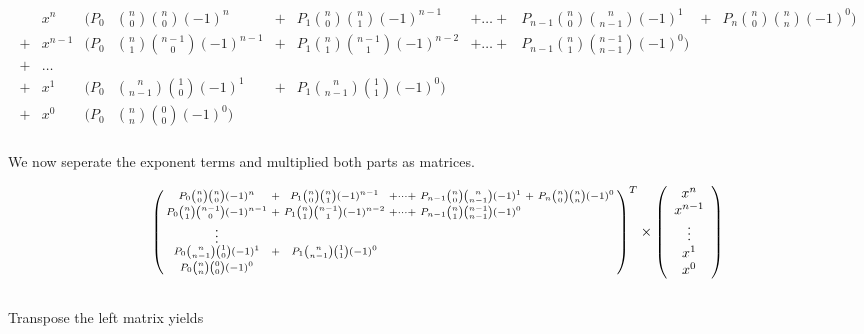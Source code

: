 \begin{gather}
    \begin{align*}
          & x^{n}   & (P_0 & {n \choose 0}{n \choose 0}(-1)^{n}     & + & P_1 {n \choose 0}{n \choose 1}(-1)^{n-1}   & + \dots + & P_{n-1} {n \choose 0}{n \choose n-1}(-1)^{1}    & + & P_{n} {n \choose 0}{n \choose n}(-1)^{0}) \\
        + & x^{n-1} & (P_0 & {n \choose 1}{n-1 \choose 0}(-1)^{n-1} & + & P_1 {n \choose 1}{n-1 \choose 1}(-1)^{n-2} & + \dots + & P_{n-1} {n \choose 1}{n-1 \choose n-1}(-1)^{0})                                                 \\
        + & \dots                                                                                                                                                                                                                  \\
        + & x^{1}   & (P_0 & {n \choose n-1}{1 \choose 0}(-1)^{1}   & + & P_1 {n \choose n-1}{1 \choose 1}(-1)^{0})                                                                                                                \\
        + & x^{0}   & (P_0 & {n \choose n}{0 \choose 0}(-1)^{0})
    \end{align*}
\end{gather}
\\ We now seperate the exponent terms and multiplied both parts as matrices.

\begin{equation*}
    \begin{psmallmatrix}
        P_0 {n \choose 0}{n \choose 0}(-1)^{n} &+&  P_1 {n \choose 0}{n \choose 1}(-1)^{n-1}  &+ \dots + &P_{n-1} {n \choose 0}{n \choose n-1}(-1)^{1}  &+&  P_{n} {n \choose 0}{n \choose n}(-1)^{0} \\
        P_0 {n \choose 1}{n-1 \choose 0}(-1)^{n-1}  &+&  P_1 {n \choose 1}{n-1 \choose 1}(-1)^{n-2} &+ \dots + &P_{n-1} {n \choose 1}{n-1 \choose n-1}(-1)^{0}                               \\
        \vdots                                                                                                                                  \\
        P_0 {n \choose n-1}{1 \choose 0}(-1)^{1} &+& P_1 {n \choose n-1}{1 \choose 1}(-1)^{0}                                                                                   \\
        P_0 {n \choose n}{0 \choose 0}(-1)^{0}
    \end{psmallmatrix}^T
    \times
    \left(
    \begin{array}{c}
        x^{n}   \\
        x^{n-1} \\
        \vdots  \\
        x^{1}   \\
        x^{0}   \\
    \end{array}
    \right)
\end{equation*}
\\ Transpose the left matrix yields

